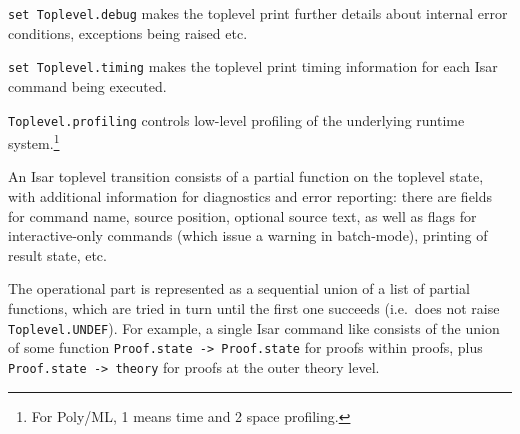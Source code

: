 \begin{isabellebody}
\begin{isamarkuptext}
\begin{description}
  \item \verb|set Toplevel.debug| makes the toplevel print further
  details about internal error conditions, exceptions being raised
  etc.

  \item \verb|set Toplevel.timing| makes the toplevel print timing
  information for each Isar command being executed.

  \item \verb|Toplevel.profiling| controls low-level profiling of the
  underlying {\ML} runtime system.\footnote{For Poly/ML, 1 means time
  and 2 space profiling.}

  \end{description}%
\end{isamarkuptext}%
\isamarkuptrue%
%
\endisatagmlref
{\isafoldmlref}%
%
\isadelimmlref
%
\endisadelimmlref
%
\isamarkuptrue%
%
\begin{isamarkuptext}%
An Isar toplevel transition consists of a partial
  function on the toplevel state, with additional information for
  diagnostics and error reporting: there are fields for command name,
  source position, optional source text, as well as flags for
  interactive-only commands (which issue a warning in batch-mode),
  printing of result state, etc.

  The operational part is represented as a sequential union of a list
  of partial functions, which are tried in turn until the first one
  succeeds (i.e.\ does not raise \verb|Toplevel.UNDEF|).  For example,
  a single Isar command like  consists of the union of
  some function \verb|Proof.state -> Proof.state| for proofs
  within proofs, plus \verb|Proof.state -> theory| for proofs at
  the outer theory level.


\end{isamarkuptext}
\end{isabellebody}
